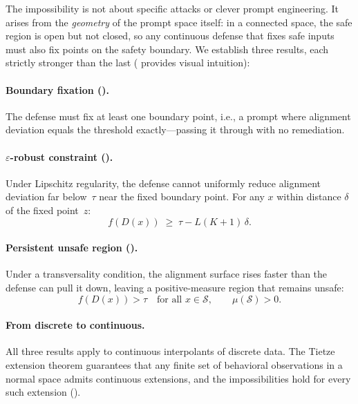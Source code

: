 \documentclass[11pt]{article}
\begin{document}
The impossibility is not about specific attacks or clever prompt
engineering. It arises from the \emph{geometry} of the prompt space
itself: in a connected space, the safe region is open but not closed,
so any continuous defense that fixes safe inputs must also fix points
on the safety boundary. We establish three results, each strictly
stronger than the last ( provides visual
intuition):

\paragraph{Boundary fixation ().}
The defense must fix at least one boundary point, i.e., a prompt where
alignment deviation equals the threshold exactly---passing it through
with no remediation.

\paragraph{$\varepsilon$-robust constraint ().}
Under Lipschitz regularity, the defense cannot uniformly reduce
alignment deviation far below~$\tau$ near the fixed boundary point.
For any $x$ within distance $\delta$ of the fixed point~$z$:
\begin{equation}\label{eq:eps-bound}
  f(D(x)) \;\geq\; \tau - L(K+1)\,\delta.
\end{equation}

\paragraph{Persistent unsafe region ().}
Under a transversality condition, the alignment surface rises faster
than the defense can pull it down, leaving a positive-measure region
that remains unsafe:
\begin{equation}\label{eq:persistent}
  f(D(x)) > \tau \quad\text{for all } x \in \mathcal{S},
  \qquad \mu(\mathcal{S}) > 0.
\end{equation}

\paragraph{From discrete to continuous.}
All three results apply to continuous interpolants of discrete data.
The Tietze extension theorem guarantees that any finite set of
behavioral observations in a normal space admits continuous extensions,
and the impossibilities hold for every such extension
().
\end{document}
